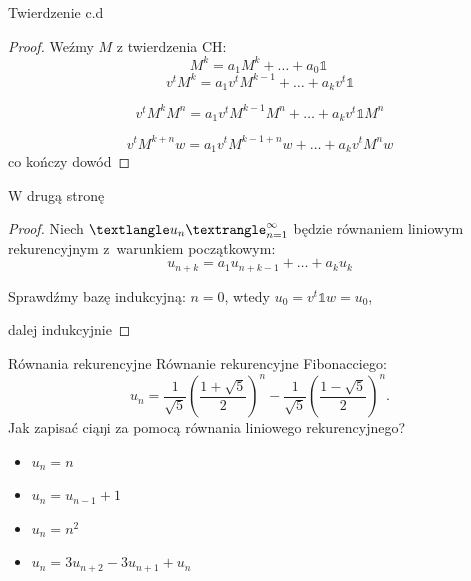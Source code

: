 \documentclass[handout]{beamer}
\theoremstyle{definition}
\theoremstyle{named}
\begin{document}
\begin{frame}{Twierdzenie c.d}

\begin{proof}
    Weźmy $M$ z twierdzenia CH: 
    \begin{equation}
        M^{k} =  a_1 M^{k} + \ldots + a_0 \mathbb{1} \
    \end{equation}
    \begin{equation}
        v^{t}M^{k} = a_1 v^{t} M^{k-1} + \ldots + a_k v^{t} \mathbb{1} 
    \end{equation} 


      \begin{equation}
          v^{t}M^{k} M^{n} = a_1 v^{t} M^{k-1} M^{n} + \ldots + a_k v^{t} \mathbb{1} M^{n}
      \end{equation}

      \begin{equation}
          v^{t}M^{k + n} w = a_1 v^{t} M^{k-1 + n}w + \ldots + a_k v^{t} M^{n}w 
      \end{equation}
      co kończy dowód
\end{proof}
\end{frame}

\begin{frame}{W drugą stronę}
\begin{proof}
    Niech $\textlangle u_n \textrangle_{n=1}^{\infty}$ będzie równaniem liniowym rekurencyjnym z~warunkiem początkowym:
    \[
    u_{n+k} = a_1 u_{n+k-1} + \ldots + a_{k} u_{k}
    \]
    

    Sprawdźmy bazę indukcyjną: \newline 
    $n=0$, wtedy $u_{0} = v^{t} \mathbb{1} w = u_0$,
    
    dalej indukcyjnie
    
\end{proof}
\end{frame}



\begin{frame}{Równania rekurencyjne}
Równanie rekurencyjne Fibonacciego: 
$$
{\displaystyle u_{n}={\frac {1}{\sqrt {5}}}\left({\frac {1+{\sqrt {5}}}{2}}\right)^{n}-{\frac {1}{\sqrt {5}}}\left({\frac {1-{\sqrt {5}}}{2}}\right)^{n}.}
$$
 Jak zapisać ciąŋi za pomocą równania liniowego rekurencyjnego? 
\begin{itemize}
    \item  $u_n = n$
    \pause 
    \item $u_n = u_{n-1} + 1$
    \pause
    \item  $u_n = n^{2}$
    \pause
    \item $u_n = 3 u_{n+2} - 3u_{n+1} + u_n$

\end{itemize}

\end{frame}
\end{document}

